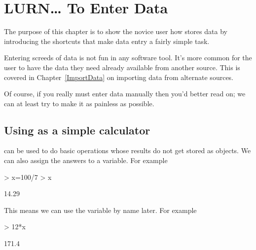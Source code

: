 



\chapter{LURN\ldots{} To Enter Data} 
\label{DataEntry} 
 

 
The purpose of this chapter is to show the novice \R{} user how \R{} stores data by introducing the shortcuts that make data entry a fairly simple task. 
 
Entering screeds of data is not fun in any software tool. It's more common for the \R{} user to have the data they need already available from another source. This is covered in Chapter~\ref{ImportData} on importing data from alternate sources. 
 
Of course, if you really must enter data manually then you'd better read on; we can at least try to make it as painless as possible. 
 
\section{Using \R{} as a simple calculator} 
\label{SimpleCalculator} 
 
\R{} can be used to do basic operations whose results do not get stored as objects. We can also assign the answers to a variable. For example 

\begin{Schunk}
\begin{Sinput}
> x=100/7 
> x 
\end{Sinput}
\begin{Soutput}
[1] 14.29
\end{Soutput}
\end{Schunk}

This means we can use the variable by name later. For example 

\begin{Schunk}
\begin{Sinput}
> 12*x 
\end{Sinput}
\begin{Soutput}
[1] 171.4
\end{Soutput}
\end{Schunk}

